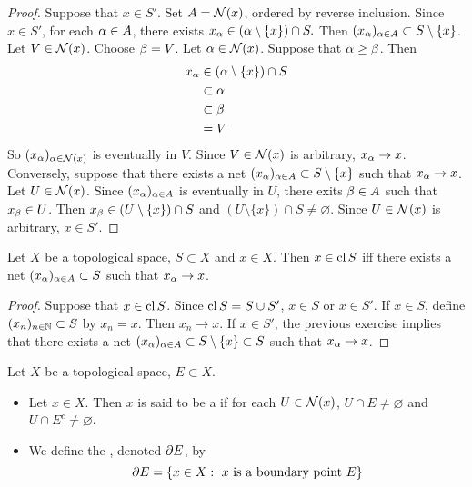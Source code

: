 \documentclass{book}
\begin{document}
	\begin{proof}
	Suppose that $x \in S'$. Set $A = \mathcal{N}(x)$, ordered by reverse inclusion.  Since $x \in S'$, for each $\alpha \in A$, there exists $x_\alpha \in (\alpha \setminus \{x\}) \cap S.$ Then $(x_{\alpha})_{\alpha \in A} \subset S \setminus \{x\}$. Let $V \in \mathcal{N}(x)$. Choose $\beta = V$. Let $\alpha \in \mathcal{N}(x)$. Suppose that $\alpha \geq \beta$. Then 
	\begin{align*}
	x_{\alpha} 
	&\in (\alpha \setminus \{x\}) \cap S \\
	& \subset \alpha \\
	& \subset \beta \\
	&= V
\end{align*}	
	So $(x_{\alpha})_{\alpha \in \mathcal{N}(x)}$ is eventually in $V$. Since $V \in \mathcal{N}(x)$ is arbitrary, $x_{\alpha } \rightarrow x$. \\
	Conversely, suppose that there exists a net $(x_{\alpha})_{\alpha \in A} \subset S \setminus \{x\}$ such that $x_{\alpha} \rightarrow x$. Let $U \in \mathcal{N}(x)$. Since $(x_{\alpha})_{\alpha \in A}$ is eventually in $U$, there exits $\beta \in A$ such that $x_{\beta} \in U$. Then $x_{\beta} \in (U \setminus \{x\}) \cap S$ and $(U \setminus \{x\}) \cap S \neq \varnothing$. Since $U \in \mathcal{N}(x)$ is arbitrary, $x \in S'$.
	\end{proof}
	
	\begin{ex}  
	Let $X$ be a topological space, $S \subset X$ and $x \in X$. Then $x \in \operatorname{cl} S$ iff there exists a net $(x_{\alpha})_{\alpha \in A} \subset S$ such that $x_{\alpha} \rightarrow x$. 
	\end{ex}

	\begin{proof}
	Suppose that $x \in \operatorname{cl} S$. Since $\operatorname{cl} S = S \cup S'$, $x \in S$ or $x \in S'$. If $x \in S$, define $(x_n)_{n \in \mathbb{N}} \subset S$ by $x_n = x$. Then $x_n \rightarrow x$. If $x \in S'$, the previous exercise implies that there exists a net $(x_{\alpha})_{\alpha \in A} \subset S \setminus \{x\} \subset S$ such that $x_{\alpha} \rightarrow x$. 
	\end{proof}

	\begin{defn} 
		Let $X$ be a topological space, $E \subset X$.  
		\begin{itemize}
			\item Let $x \in X$. Then $x$ is said to be a  if for each $U \in \mathcal{N}(x)$, $U \cap E \neq \varnothing$ and $U \cap E^c \neq \varnothing$.
			\item We define the , denoted $\partial E$, by 
			$$\partial E = \{x \in X: \text{ $x$ is a boundary point $E$}\}$$
		\end{itemize}
	\end{defn}
	
\end{document}
